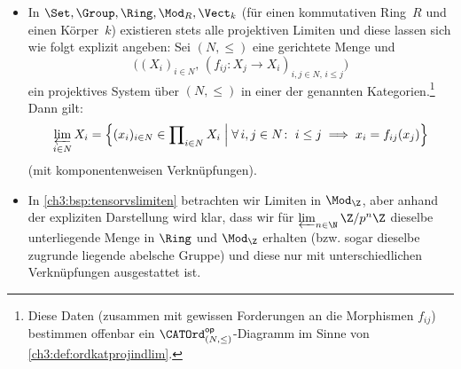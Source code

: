 \begin{thBeispiel}
    \begin{thBemerkung}\hfill
        \begin{itemize}
            \item
                In $\Set,\Group,\Ring,\Mod_R,\Vect_k$ (für einen kommutativen
                Ring~$R$ und einen Körper~$k$) existieren stets alle projektiven
                Limiten und diese lassen sich wie folgt explizit angeben:
                Sei $(N,\leq)$ eine gerichtete Menge und 
                \[ \bigl( (X_i)_{i\in N},
                \, (f_{ij}\colon X_j\to X_i)_{i,j\in N,\, i\leq j} \bigr) \]
                ein
                projektives System über $(N,\leq)$ in einer der genannten
                Kategorien.\footnote{%
                    Diese Daten (zusammen mit gewissen Forderungen an die
                    Morphismen $f_{ij}$) bestimmen offenbar ein
                    $\Ord{(N,\leq)}\op$-Diagramm im Sinne von
                    \cref{ch3:def:ordkatprojindlim}.%
                } Dann gilt:
                \[ \varprojlim_{i\in N} X_i 
                    = \Bigl\{
                        (x_i)_{i\in N} \in \prod\nolimits_{i\in N} X_i
                        \;\Big\vert\; \forall\,i,j\in N\colon\;
                        i \leq j \implies x_i = f_{ij}(x_j)
                    \Bigr\}
                \]
                (mit komponentenweisen Verknüpfungen).
                
            \item
                In \cref{ch3:bsp:tensorvslimiten} betrachten wir Limiten in
                $\Mod_\Z$, aber anhand der expliziten Darstellung wird klar,
                dass wir für $\varprojlim_{n\in\N} \txtZQuot{p^n}$ dieselbe
                unterliegende Menge in $\Ring$ und $\Mod_\Z$ erhalten (bzw.
                sogar dieselbe zugrunde liegende abelsche Gruppe) und diese 
                nur mit unterschiedlichen Verknüpfungen ausgestattet ist.
        \end{itemize}
    \end{thBemerkung}
\end{thBeispiel}


